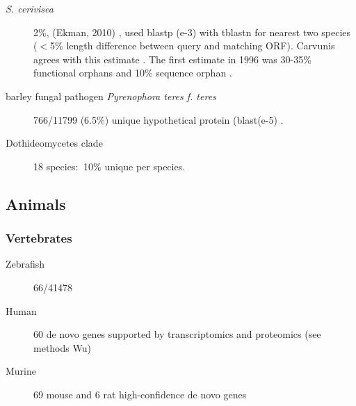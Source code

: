     \begin{description}

        \item[\textit{S. cerivisea}] 2\%, (Ekman, 2010)
            \cite{ekman_identifying_2010}, used blastp (e-3) with tblastn for
            nearest two species ($<$5\% length difference between query and
            matching ORF). Carvunis agrees with this estimate
            \cite{carvunis_proto-genes_2012}. The first estimate in 1996 was
            30-35\% functional orphans \cite{dujon_yeast_1996} and 10\%
            sequence orphan \cite{casari_bioinformatics_1996}.

        \item[barley fungal pathogen \textit{Pyrenophora teres f. teres}]
            766/11799 (6.5\%) unique hypothetical protein (blast(e-5) \cite{ellwood_first_2010}.

        \item[Dothideomycetes clade] 18 species: $~$10\% unique per species.
            \cite{ohm_diverse_2012}
    
    \end{description}

\subsection{Animals}

  \subsubsection{Vertebrates}
    \begin{description}
        \item[Zebrafish] 66/41478 \cite{yang_genome-wide_2013}
        \item[Human] 60 de novo genes supported by transcriptomics and
            proteomics (see methods Wu) \cite{wu_novo_2011}
        \item[Murine] 69 mouse and 6 rat high-confidence de novo genes
            \cite{murphy_novo_2012}
    \end{description}

